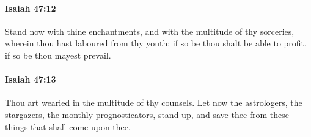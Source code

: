 		\paragraph{Isaiah 47:12} %
			\label{ISAIAH-47-12}

			Stand now with thine enchantments, and with the multitude of thy sorceries, wherein thou hast laboured from thy youth; if so be thou shalt be able to profit, if so be thou mayest prevail.


		\paragraph{Isaiah 47:13} %
			\label{ISAIAH-47-13}

			Thou art wearied in the multitude of thy counsels. Let now the astrologers, the stargazers, the monthly prognosticators, stand up, and save thee from these things that shall come upon thee.

